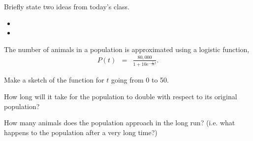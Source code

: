 \postClass

\begin{problem}
\item Briefly state two ideas from today's class.
  \begin{itemize}
  \item
  \item
  \end{itemize}
\item The number of animals in a population is approximated using a
  logistic function,
  \begin{eqnarray*}
    P(t) & = & \frac{80,000}{1+10e^{-\frac{1}{10}t}}.
  \end{eqnarray*}
  \begin{subproblem}
  \item Make a sketch of the function for $t$ going from 0 to 50.
  \item How long will it take for the population to double with
    respect to its original population?
  \item How many animals does the population approach in the long run?
    (i.e. what happens to the population after a very long time?)
  \end{subproblem}
\end{problem}


